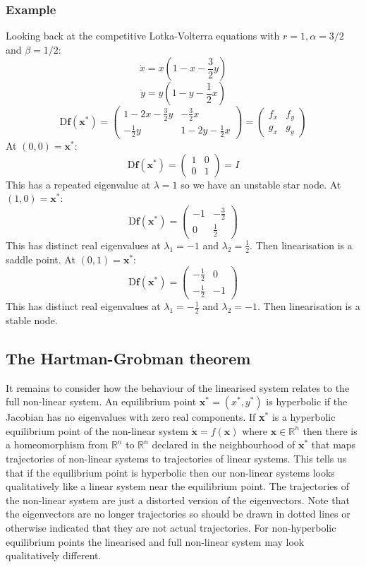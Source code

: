 \documentclass[12pt]{article}
\begin{document}
\subsubsection*{Example}
Looking back at the competitive Lotka-Volterra equations with \(r=1,\alpha=3/2\) and \(\beta=1/2\):
\[\dot{x}=x(1-x-\frac{3}{2}y)\]
\[\dot{y}=y(1-y-\frac{1}{2}x)\]
\[\text{D}\textbf{f}(\textbf{x}^*)=\begin{pmatrix}
    1-2x-\frac{3}{2}y & -\frac{3}{2}x \\
    -\frac{1}{2}y & 1-2y-\frac{1}{2}x
\end{pmatrix}=\begin{pmatrix}
    f_x & f_y \\
    g_x & g_y
\end{pmatrix}\]
At \((0,0)=\textbf{x}^*\):
\[\text{D}\textbf{f}(\textbf{x}^*)=\begin{pmatrix}
    1 & 0 \\
    0 & 1
\end{pmatrix}=I\]
This has a repeated eigenvalue at \(\lambda=1\) so we have an unstable star node. At \((1,0)=\textbf{x}^*\):
\[\text{D}\textbf{f}(\textbf{x}^*)=\begin{pmatrix}
    -1 & -\frac{3}{2} \\
    0 & \frac{1}{2}
\end{pmatrix}\]
This has distinct real eigenvalues at \(\lambda_1=-1\) and \(\lambda_2=\frac{1}{2}\). Then linearisation is a saddle point. At \((0,1)=\textbf{x}^*\):
\[\text{D}\textbf{f}(\textbf{x}^*)=\begin{pmatrix}
    -\frac{1}{2} & 0 \\
    -\frac{1}{2} & -1
\end{pmatrix}\]
This has distinct real eigenvalues at \(\lambda_1=-\frac{1}{2}\) and \(\lambda_2=-1\). Then linearisation is a stable node.
\subsection*{The Hartman-Grobman theorem}
It remains to consider how the behaviour of the linearised system relates to the full non-linear system. An equilibrium point \(\textbf{x}^*=(x^*,y^*)\) is hyperbolic if the Jacobian has no eigenvalues with zero real components. If \textbf{x}\(^*\) is a hyperbolic equilibrium point of the non-linear system \(\dot{\textbf{x}}=f(\textbf{x})\) where \(\textbf{x}\in\mathbb{R}^n\) then there is a homeomorphism from \(\mathbb{R}^n\) to \(\mathbb{R}^n\) declared in the neighbourhood of \(\textbf{x}^*\) that maps trajectories of non-linear systems to trajectories of linear systems. This tells us that if the equilibrium point is hyperbolic then our non-linear systems looks qualitatively like a linear system near the equilibrium point. The trajectories of the non-linear system are just a distorted version of the eigenvectors. Note that the eigenvectors are no longer trajectories so should be drawn in dotted lines or otherwise indicated that they are not actual trajectories. For non-hyperbolic equilibrium points the linearised and full non-linear system may look qualitatively different.
\end{document}
